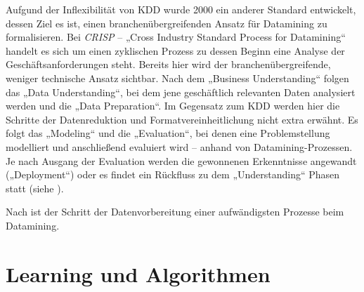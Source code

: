 Aufgund der Inflexibilität von KDD wurde 2000 ein anderer Standard entwickelt, dessen Ziel es ist, einen branchenübergreifenden Ansatz für Datamining zu formalisieren. Bei \textit{CRISP} -- „Cross Industry Standard Process for Datamining“\cite{crisp2000} handelt es sich um einen zyklischen Prozess zu dessen Beginn eine Analyse der Geschäftsanforderungen steht. Bereits hier wird der branchenübergreifende, weniger technische Ansatz sichtbar. Nach dem „Business Understanding“ folgen das „Data Understanding“, bei dem jene geschäftlich relevanten Daten analysiert werden und die „Data Preparation“. Im Gegensatz zum KDD werden hier die Schritte der Datenreduktion und Formatvereinheitlichung nicht extra erwähnt. Es folgt das „Modeling“ und die „Evaluation“, bei denen eine Problemstellung modelliert und anschließend evaluiert wird -- anhand von Datamining-Prozessen. Je nach Ausgang der Evaluation werden die gewonnenen Erkenntnisse angewandt („Deployment“) oder es findet ein Rückfluss zu dem „Understanding“ Phasen statt (siehe \cite{crisp2000}).

Nach \cite{pocket2014} ist der Schritt der Datenvorbereitung einer aufwändigsten Prozesse beim Datamining.

\section{Learning und Algorithmen}